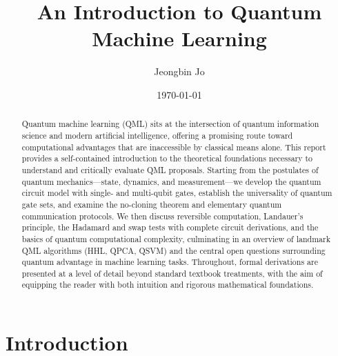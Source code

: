 \documentclass[aps, reprint, twocolumn, superscriptaddress, floatfix]{revtex4-2}
\begin{document}

\title{An Introduction to Quantum Machine Learning}

\author{Jeongbin Jo}

\date{\today}

\begin{abstract}
Quantum machine learning (QML) sits at the intersection of quantum information
science and modern artificial intelligence, offering a promising route toward
computational advantages that are inaccessible by classical means alone.
This report provides a self-contained introduction to the theoretical foundations
necessary to understand and critically evaluate QML proposals.  Starting from the
postulates of quantum mechanics---state, dynamics, and measurement---we develop
the quantum circuit model with single- and multi-qubit gates, establish the
universality of quantum gate sets, and examine the no-cloning theorem and
elementary quantum communication protocols.  We then discuss reversible
computation, Landauer's principle, the Hadamard and swap tests with complete
circuit derivations, and the basics of quantum computational complexity,
culminating in an overview of landmark QML algorithms (HHL, QPCA, QSVM) and the
central open questions surrounding quantum advantage in machine learning tasks.
Throughout, formal derivations are presented at a level of detail beyond standard
textbook treatments, with the aim of equipping the reader with both intuition and
rigorous mathematical foundations.
\end{abstract}

\maketitle
\thispagestyle{fancytitle}
\addwatermark

\onecolumngrid  %
\vspace{-1cm}
\tableofcontents
\vspace{1cm}    %
\twocolumngrid  %

\section{Introduction}
\label{sec:introduction}
\end{document}
